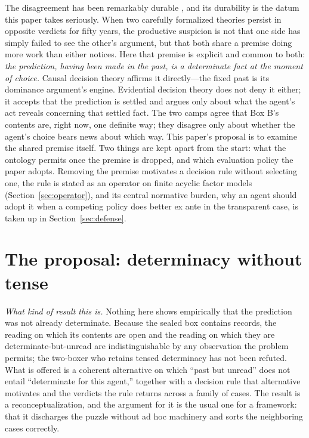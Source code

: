 The disagreement has been remarkably durable \cite{wolpert2011lesson}, and its durability is the datum this paper takes seriously. When two carefully formalized theories persist in opposite verdicts for fifty years, the productive suspicion is not that one side has simply failed to see the other's argument, but that both share a premise doing more work than either notices. Here that premise is explicit and common to both: \emph{the prediction, having been made in the past, is a determinate fact at the moment of choice.} Causal decision theory affirms it directly---the fixed past is its dominance argument's engine. Evidential decision theory does not deny it either; it accepts that the prediction is settled and argues only about what the agent's act reveals concerning that settled fact. The two camps agree that Box B's contents are, right now, one definite way; they disagree only about whether the agent's choice bears news about which way. This paper's proposal is to examine the shared premise itself. Two things are kept apart from the start: what the ontology permits once the premise is dropped, and which evaluation policy the paper adopts. Removing the premise motivates a decision rule without selecting one, the rule is stated as an operator on finite acyclic factor models (Section~\ref{sec:operator}), and its central normative burden, why an agent should adopt it when a competing policy does better ex ante in the transparent case, is taken up in Section~\ref{sec:defense}.

\section{The proposal: determinacy without tense}
\label{sec:proposal}

\noindent \textit{What kind of result this is.} Nothing here shows empirically that the prediction was not already determinate. Because the sealed box contains records, the reading on which its contents are open and the reading on which they are determinate-but-unread are indistinguishable by any observation the problem permits; the two-boxer who retains tensed determinacy has not been refuted. What is offered is a coherent alternative on which ``past but unread'' does not entail ``determinate for this agent,'' together with a decision rule that alternative motivates and the verdicts the rule returns across a family of cases. The result is a reconceptualization, and the argument for it is the usual one for a framework: that it discharges the puzzle without ad hoc machinery and sorts the neighboring cases correctly.

